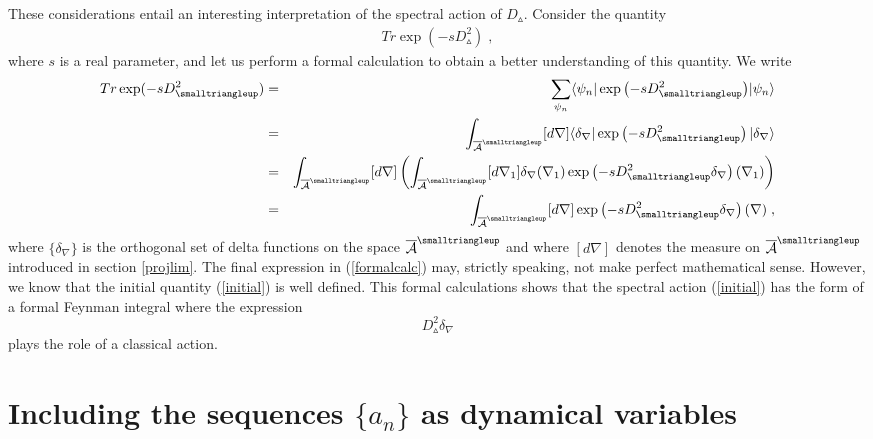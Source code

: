 \documentclass[12pt]{article}
\newcommand{\ba}{\begin{eqnarray}}
\newcommand{\ea}{\end{eqnarray}}
\newcommand{\nn}{\nonumber}
\def\d{\delta}
\def\ca{{\cal A}}
\begin{document}
These considerations entail an interesting interpretation of the spectral action of $D_{\smalltriangleup}$. Consider the quantity
\ba 
Tr \exp(-s D^2_{\smalltriangleup})\;,
\label{initial}
\ea
where $s$ is a real parameter, and let us perform a formal calculation to obtain a better understanding of this quantity. We write
\ba 
Tr \exp(-s D^2_{\smalltriangleup})&=& 
\sum_{\psi_n}\langle \psi_n|\exp{\left(-s D^2_{\smalltriangleup}\right)}|\psi_n\rangle
\nn\\
&=& \int_{\overline{\ca}^{\smalltriangleup}}[d\nabla]\langle\d_\nabla|\exp\left(-s D^2_{\smalltriangleup}\right)|\d_\nabla\rangle
\nn\\
&=&\int_{\overline{\ca}^{\smalltriangleup}}[d\nabla]\left(\int_{\overline{\ca}^{\smalltriangleup}}[d\nabla_1]\d_{\nabla}(\nabla_1)\exp\left(-s D^2_{\smalltriangleup}\d_{\nabla}\right)(\nabla_1) \right)
\nn\\
&=& \int_{\overline{\ca}^{\smalltriangleup}}[d\nabla]\exp\left(-s D^2_{\smalltriangleup}\d_{\nabla}\right)(\nabla)\;,
\label{formalcalc}
\ea
where $\{\d_{\nabla}\}$ is the orthogonal set of delta functions on the space $\overline{\ca}^{\smalltriangleup}$ and where $[d\nabla]$ denotes the measure on $\overline{\ca}^{\smalltriangleup}$ introduced in section \ref{projlim}. The final expression in (\ref{formalcalc}) may, strictly speaking, not make perfect mathematical sense. However, we know that the initial quantity (\ref{initial}) is well defined. This formal calculations shows that the spectral action (\ref{initial}) has the form of a formal Feynman integral where the expression
\[
D^2_{\smalltriangleup}\d_{\nabla}
\] 
plays the role of a classical action. 
































\section{Including the sequences $\{a_n\}$ as dynamical variables}
\label{includea}
\end{document}
